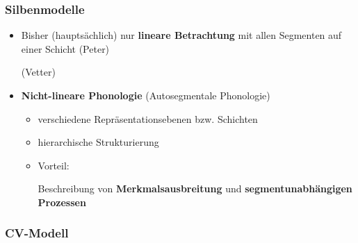 \begin{frame}
\frametitle{Silbenmodelle}

\begin{itemize}
	\item Bisher (hauptsächlich) nur \textbf{lineare Betrachtung} mit allen Segmenten auf einer Schicht
	\ea
	 (Peter)
	\z
	
	\ea
	 (Vetter)
	\z
	
	\item \textbf{Nicht-lineare Phonologie} (Autosegmentale Phonologie)
	
	\begin{itemize}
		\item verschiedene Repräsentationsebenen bzw. Schichten
		
		\item hierarchische Strukturierung
		
		\item Vorteil: 
		
		Beschreibung von \textbf{Merkmalsausbreitung} und \textbf{segmentunabhängigen Prozessen}
		
	\end{itemize}
\end{itemize}

\end{frame}


\subsubsection{CV-Modell}

